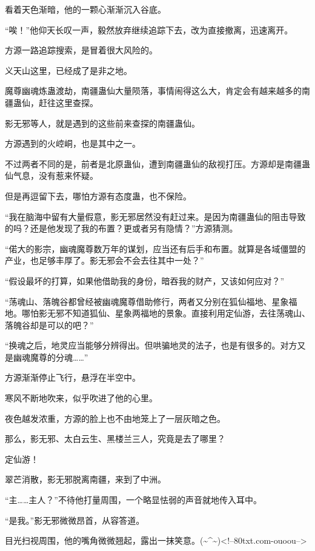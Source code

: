 \begin{this_body}
看着天色渐暗，他的一颗心渐渐沉入谷底。

“唉！”他仰天长叹一声，毅然放弃继续追踪下去，改为直接撤离，迅速离开。

方源一路追踪搜索，是冒着很大风险的。

义天山这里，已经成了是非之地。

魔尊幽魂炼蛊渡劫，南疆蛊仙大量陨落，事情闹得这么大，肯定会有越来越多的南疆蛊仙，赶往这里查探。

影无邪等人，就是遇到的这些前来查探的南疆蛊仙。

方源遇到的火崆峒，也是其中之一。

不过两者不同的是，前者是北原蛊仙，遭到南疆蛊仙的敌视打压。方源却是南疆蛊仙气息，没有惹来怀疑。

但是再逗留下去，哪怕方源有态度蛊，也不保险。

“我在脑海中留有大量假意，影无邪居然没有赶过来。是因为南疆蛊仙的阻击导致的吗？还是他发现了我的布置？更或者另有隐情？”方源猜测。

“偌大的影宗，幽魂魔尊数万年的谋划，应当还有后手和布置。就算是各域僵盟的产业，也足够丰厚了。影无邪会不会去往其中一处？”

“假设最坏的打算，如果他借助我的身份，暗吞我的财产，又该如何应对？”

“荡魂山、落魄谷都曾经被幽魂魔尊借助修行，两者又分别在狐仙福地、星象福地。哪怕影无邪不知道狐仙、星象两福地的景象。直接利用定仙游，去往荡魂山、落魄谷却是可以的吧？”

“换魂之后，地灵应当能够分辨得出。但哄骗地灵的法子，也是有很多的。对方又是幽魂魔尊的分魂……”

方源渐渐停止飞行，悬浮在半空中。

寒风不断地吹来，似乎吹进了他的心里。

夜色越发浓重，方源的脸上也不由地笼上了一层灰暗之色。

那么，影无邪、太白云生、黑楼兰三人，究竟是去了哪里？

定仙游！

翠芒消散，影无邪脱离南疆，来到了中洲。

“主……主人？”不待他打量周围，一个略显怯弱的声音就地传入耳中。

“是我。”影无邪微微昂首，从容答道。

目光扫视周围，他的嘴角微微翘起，露出一抹笑意。(\~{}\^{}\~{})<!--80txt.com-ouoou-->

\end{this_body}

